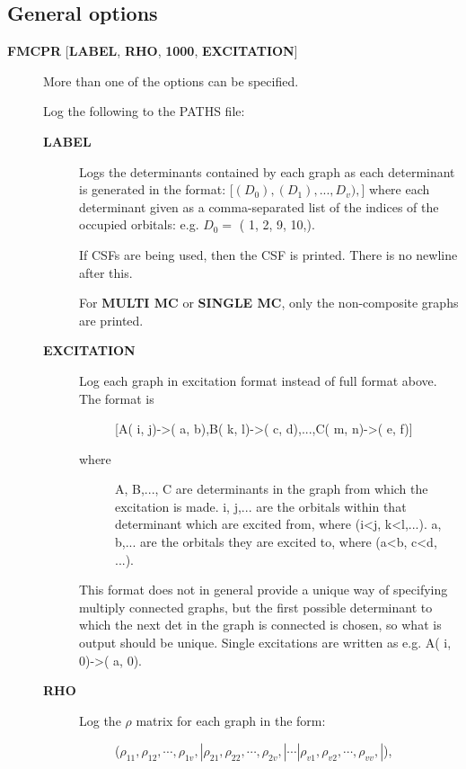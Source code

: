 \documentclass[openany,a4paper,10pt]{manual}
\begin{document}
\subsection{General options}
\begin{description}
\item[\textbf{FMCPR} {[}\textbf{LABEL}, \textbf{RHO}, \textbf{1000}, \textbf{EXCITATION}{]}]
More than one of the options can be specified.

Log the following to the PATHS file:
\begin{description}
\item[\textbf{LABEL}]
Logs the determinants contained by each graph as each determinant
is generated in the format:
{[}$(D_0),(D_1),...,D_v),${]}
where each determinant given as a comma-separated list of the
indices of the occupied orbitals:
e.g. $D_0 =$ (    1,    2,    9,   10,).

If CSFs are being used, then the CSF is printed.  There is no newline after this.

For \textbf{MULTI MC} or \textbf{SINGLE MC}, only the non-composite graphs are printed.

\item[\textbf{EXCITATION}]\begin{description}
\item[Log each graph in excitation format instead of full format above.  The format is]
{[}A(    i,    j)-\textgreater{}(    a,    b),B(    k,    l)-\textgreater{}(    c,    d),...,C(    m,    n)-\textgreater{}(    e,    f){]}

\item[where]
A, B,..., C are determinants in the graph from which the excitation is made.
i, j,... are the orbitals within that determinant which are excited from, where (i\textless{}j, k\textless{}l,...).
a, b,... are the orbitals they are excited to, where (a\textless{}b, c\textless{}d, ...).

\end{description}

This format does not in general provide a unique way of
specifying multiply connected graphs, but the first possible
determinant to which the next det in the graph is connected is
chosen, so what is output should be unique.  Single excitations
are written as e.g. A(    i,    0)-\textgreater{}(    a,    0).

\item[\textbf{RHO}]\begin{description}
\item[Log the $\rho$ matrix for each graph in the form:]
($\rho_{11}, \rho_{12}, \cdots, \rho_{1v},| \rho_{21}, \rho_{22}, \cdots, \rho_{2v},| \cdots | \rho_{v1}, \rho_{v2}, \cdots, \rho_{vv},|$),


\end{description}
\end{description}
\end{description}
\end{document}
